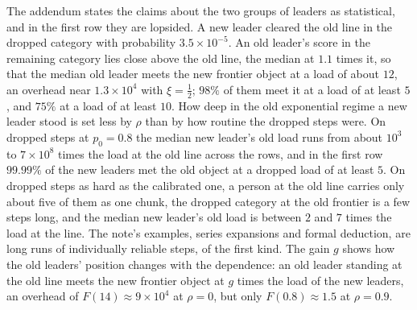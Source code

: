 \documentclass{article}
\begin{document}
The addendum states the claims about the two groups of leaders as statistical, and in the first row they are lopsided. A new leader cleared the old line in the dropped category with probability $3.5 \times 10^{-5}$. An old leader's score in the remaining category lies close above the old line, the median at $1.1$ times it, so that the median old leader meets the new frontier object at a load of about $12$, an overhead near $1.3 \times 10^{4}$ with $\xi = \tfrac12$; $98\%$ of them meet it at a load of at least $5$, and $75\%$ at a load of at least $10$. How deep in the old exponential regime a new leader stood is set less by $\rho$ than by how routine the dropped steps were. On dropped steps at $p_0 = 0.8$ the median new leader's old load runs from about $10^{3}$ to $7 \times 10^{8}$ times the load at the old line across the rows, and in the first row $99.99\%$ of the new leaders met the old object at a dropped load of at least $5$. On dropped steps as hard as the calibrated one, a person at the old line carries only about five of them as one chunk, the dropped category at the old frontier is a few steps long, and the median new leader's old load is between $2$ and $7$ times the load at the line. The note's examples, series expansions and formal deduction, are long runs of individually reliable steps, of the first kind. The gain $g$ shows how the old leaders' position changes with the dependence: an old leader standing at the old line meets the new frontier object at $g$ times the load of the new leaders, an overhead of $F(14) \approx 9 \times 10^{4}$ at $\rho = 0$, but only $F(0.8) \approx 1.5$ at $\rho = 0.9$.
\end{document}
